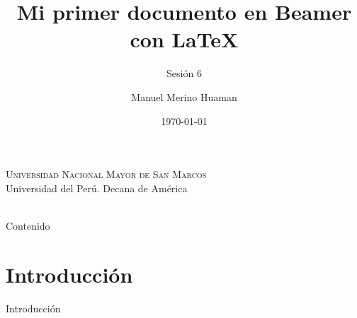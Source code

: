\documentclass[aspectratio = 169, 11pt ]{beamer}
\title{Mi primer documento en Beamer con \LaTeX}
\subtitle{Sesión 6}
\author[Manuel Merino]{Manuel Merino Huaman}
\date{\today}
\institute[UNMSM]{
        Bach. Computación Científica - UNMSM
    }
\begin{document}
            {
                        \begin{frame}[plain]
                   \begin{center}
                       {\Large \textsc{\textrm{Universidad Nacional Mayor de San Marcos}}}\\
                       {\textrm{Universidad del Perú. Decana de América}}\\
                       \vspace{1cm}
                       \textbf{\textsc{\textrm{\inserttitle}}}\\ %
                       \insertsubtitle
                   \end{center} 
              \end{frame}
            }

            \begin{frame}{Contenido}
                \tableofcontents
            \end{frame}
        
            \section{Introducción}
                \begin{frame}{Introducción}
                    \justifying
                    \lipsum[8]
                \end{frame}

\end{document}
